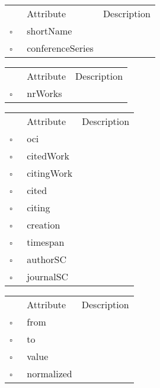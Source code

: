 \begin{table}
\caption{Proceedings  }

\begin{longtable}{llp{8cm}}
& Attribute & Description \\
$\square$\ & shortName &  \\
$\square$\ & conferenceSeries &  \\
\end{longtable}
\label{attr:Proceedings}
\end{table}

\begin{table}
\caption{Publisher  }

\begin{longtable}{llp{8cm}}
& Attribute & Description \\
$\square$\ & nrWorks &  \\
\end{longtable}
\label{attr:Publisher}
\end{table}

\begin{table}
\caption{Reference  }

\begin{longtable}{llp{8cm}}
& Attribute & Description \\
$\square$\ & oci &  \\
$\square$\ & citedWork &  \\
$\square$\ & citingWork &  \\
$\square$\ & cited &  \\
$\square$\ & citing &  \\
$\square$\ & creation &  \\
$\square$\ & timespan &  \\
$\square$\ & authorSC &  \\
$\square$\ & journalSC &  \\
\end{longtable}
\label{attr:Reference}
\end{table}

\begin{table}
\caption{ReferenceFlow  }

\begin{longtable}{llp{8cm}}
& Attribute & Description \\
$\square$\ & from &  \\
$\square$\ & to &  \\
$\square$\ & value &  \\
$\square$\ & normalized &  \\
\end{longtable}
\label{attr:ReferenceFlow}
\end{table}

